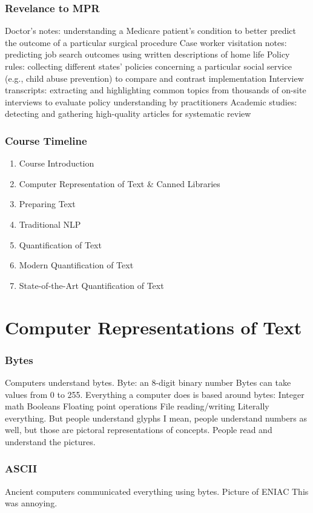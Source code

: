 \documentclass[smaller,xcolor=table,aspectratio=169]{beamer}
\begin{document}
\begin{frame}
  \frametitle{Revelance to MPR}
  Doctor's notes:  understanding a Medicare patient's condition to better predict the outcome of a particular surgical procedure
  Case worker visitation notes:  predicting job search outcomes using written descriptions of home life
  Policy rules:  collecting different states' policies concerning a particular social service (e.g., child abuse prevention) to compare and contrast implementation
  Interview transcripts:  extracting and highlighting common topics from thousands of on-site interviews to evaluate policy understanding by practitioners
  Academic studies:  detecting and gathering high-quality articles for systematic review
\end{frame}

\begin{frame}
  \frametitle{Course Timeline}
  \begin{enumerate}
    \item Course Introduction
    \item Computer Representation of Text \& Canned Libraries
    \item Preparing Text
    \item Traditional NLP
    \item Quantification of Text
    \item Modern Quantification of Text
    \item State-of-the-Art Quantification of Text
  \end{enumerate}
\end{frame}

\section{Computer Representations of Text}

\begin{frame}
  \frametitle{Bytes}
  Computers understand bytes.
  Byte: an 8-digit binary number
  Bytes can take values from 0 to 255.
  Everything a computer does is based around bytes:
  Integer math
  Booleans
  Floating point operations
  File reading/writing
  Literally everything.
  But people understand glyphs
  I mean, people understand numbers as well, but those are pictoral representations of concepts.  People read and understand the pictures.
\end{frame}

\begin{frame}
  \frametitle{ASCII}
  Ancient computers communicated everything using bytes.
  Picture of ENIAC
  This was annoying.
\end{frame}
\end{document}
